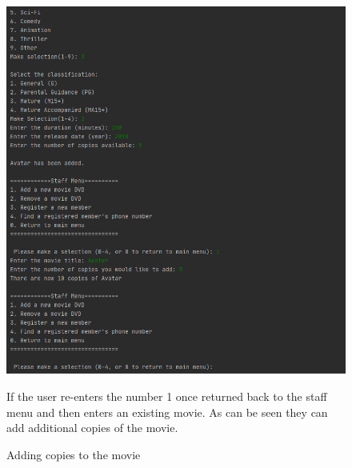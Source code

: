 \documentclass[a4paper,12pt]{article}
\begin{document}
\begin{figure}[!htb]
\centering
\includegraphics[width=1\textwidth]{3}
\caption{Adding copies to the movie}
\medskip
\small
If the user re-enters the number 1 once returned back to the staff menu and then enters an existing movie. As can be seen they can add additional copies of the movie.
\end{figure}
\end{document}
